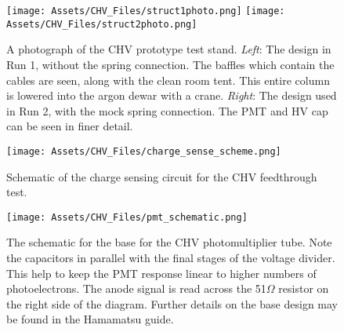 \begin{figure}
\centering
    \texttt{[image: Assets/CHV\_Files/struct1photo.png]}
    \texttt{[image: Assets/CHV\_Files/struct2photo.png]}
    \caption[A photograph of the CHV prototype test stand.]%
    {A photograph of the CHV prototype test stand. 
    \textit{Left}: The design in Run 1, without the spring connection.
    The baffles which contain the cables are seen, along with the clean room tent.
    This entire column is lowered into the argon dewar with a crane.
    \textit{Right}: The design used in Run 2, with the mock spring connection.
    The PMT and HV cap can be seen in finer detail.}
    \label{fig:test_stand_1}
\end{figure}

\begin{figure}
\texttt{[image: Assets/CHV\_Files/charge\_sense\_scheme.png]}
\caption[ Schematic of the charge sensing circuit for the CHV feedthrough test.]%
{ Schematic of the charge sensing circuit for the CHV feedthrough test.}
\label{fig:charge_sense_scheme}
\end{figure}

\begin{figure}
    \centering
    \texttt{[image: Assets/CHV\_Files/pmt\_schematic.png]}
    \caption[The schematic for the base for the CHV photomultiplier tube.]%
    {The schematic for the base for the CHV photomultiplier tube.
    Note the capacitors in parallel with the final stages of the voltage divider.
    This help to keep the PMT response linear to higher numbers of photoelectrons.
    The anode signal is read across the 51$\Omega$ resistor on the right side of the diagram. Further details on the base design may be found in the Hamamatsu guide\cite{noauthor_photomultiplier_2007}.
    }
    \label{fig:pmt_circuit}
\end{figure}



